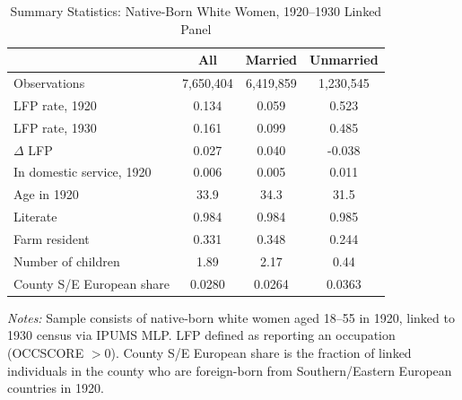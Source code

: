 \begin{table}[htbp]
\centering
\caption{Summary Statistics: Native-Born White Women, 1920--1930 Linked Panel}
\label{tab:sumstats}
\begin{tabular}{lccc}
\hline\hline
 & All & Married & Unmarried \\
\hline
Observations & 7,650,404 & 6,419,859 & 1,230,545 \\
LFP rate, 1920 & 0.134 & 0.059 & 0.523 \\
LFP rate, 1930 & 0.161 & 0.099 & 0.485 \\
$\Delta$ LFP & 0.027 & 0.040 & -0.038 \\
In domestic service, 1920 & 0.006 & 0.005 & 0.011 \\
Age in 1920 & 33.9 & 34.3 & 31.5 \\
Literate & 0.984 & 0.984 & 0.985 \\
Farm resident & 0.331 & 0.348 & 0.244 \\
Number of children & 1.89 & 2.17 & 0.44 \\
County S/E European share & 0.0280 & 0.0264 & 0.0363 \\
\hline\hline
\end{tabular}
\begin{tablenotes}[flushleft]
\small
\item \textit{Notes:} Sample consists of native-born white women aged 18--55 in 1920, linked to 1930 census via IPUMS MLP. LFP defined as reporting an occupation (OCCSCORE $> 0$). County S/E European share is the fraction of linked individuals in the county who are foreign-born from Southern/Eastern European countries in 1920.
\end{tablenotes}
\end{table}
